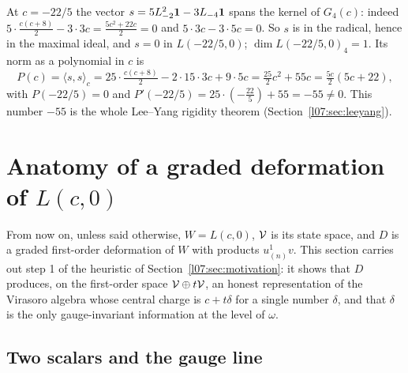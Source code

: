 \begin{example}\label{l07:ex:leeyang}
At $c = -22/5$ the vector $s = 5L_{-2}^2\mathbf{1} - 3L_{-4}\mathbf{1}$ spans the kernel of $G_4(c)$:
indeed $5\cdot\frac{c(c+8)}2 - 3\cdot3c = \frac{5c^2+22c}{2} = 0$ and $5\cdot3c-3\cdot5c = 0$. So $s$ is
in the radical, hence in the maximal ideal, and $s = 0$ in $L(-22/5,0)$; $\dim L(-22/5,0)_4 = 1$. Its
norm as a polynomial in $c$ is
\begin{equation*}
 P(c) = \langle s,s\rangle_c = 25\cdot\tfrac{c(c+8)}2 - 2\cdot15\cdot3c + 9\cdot5c
 = \tfrac{25}{2}c^2 + 55c = \tfrac{5c}{2}(5c+22),
\end{equation*}
with $P(-22/5) = 0$ and $P'(-22/5) = 25\cdot(-\tfrac{22}{5}) + 55 = -55\ne0$. This number $-55$ is the
whole Lee--Yang rigidity theorem (Section~\ref{l07:sec:leeyang}).
\end{example}

\section{Anatomy of a graded deformation of \texorpdfstring{$L(c,0)$}{L(c,0)}}\label{l07:sec:anatomy}

From now on, unless said otherwise, $W = L(c,0)$, $\mathcal{V}$ is its state space, and
$D$ is a graded first-order deformation of $W$ with products $u^1_{(n)}v$. This section carries out
step 1 of the heuristic of Section~\ref{l07:sec:motivation}: it shows that $D$ produces, on the
first-order space $\mathcal{V}\oplus t\mathcal{V}$, an honest representation of the Virasoro algebra whose central
charge is $c+t\delta$ for a single number $\delta$, and that $\delta$ is the only gauge-invariant
information at the level of $\omega$.

\subsection{Two scalars and the gauge line}

